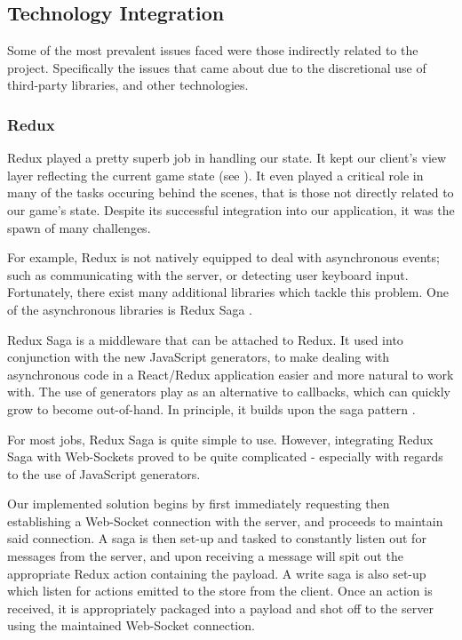 \documentclass{standalone}
\begin{document}
		\subsection{Technology Integration}
			Some of the most prevalent issues faced were those indirectly related to the project. Specifically the issues that came about due to the discretional use of third-party libraries, and other technologies.

			\subsubsection{Redux} \label{sec:reduxIntegration}
				Redux played a pretty superb job in handling our state. It kept our client's view layer reflecting the current game state (see ). It even played a critical role in many of the tasks occuring behind the scenes, that is those not directly related to our game's state. Despite its successful integration into our application, it was the spawn of many challenges.

				For example, Redux is not natively equipped to deal with asynchronous events; such as communicating with the server, or detecting user keyboard input. Fortunately, there exist many additional libraries which tackle this problem. One of the asynchronous libraries is Redux Saga \parencite{reduxSaga}.

				Redux Saga is a middleware that can be attached to Redux. It used into conjunction with the new JavaScript generators, to make dealing with asynchronous code in a React/Redux application easier and more natural to work with. The use of generators play as an alternative to callbacks, which can quickly grow to become out-of-hand. In principle, it builds upon the saga pattern \parencite{sagas}.

				For most jobs, Redux Saga is quite simple to use. However, integrating Redux Saga with Web-Sockets proved to be quite complicated - especially with regards to the use of JavaScript generators.

				Our implemented solution begins by first immediately requesting then establishing a Web-Socket connection with the server, and proceeds to maintain said connection. A saga is then set-up and tasked to constantly listen out for messages from the server, and upon receiving a message will spit out the appropriate Redux action containing the payload. A write saga is also set-up which listen for actions emitted to the store from the client. Once an action is received, it is appropriately packaged into a payload and shot off to the server using the maintained Web-Socket connection.
\end{document}
